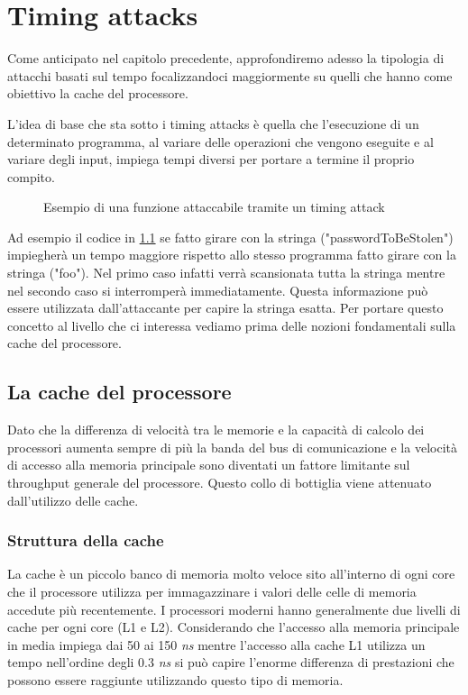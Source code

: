 \chapter{Timing attacks}
	Come anticipato nel capitolo precedente, approfondiremo adesso la tipologia di attacchi basati sul tempo focalizzandoci maggiormente su quelli che hanno come obiettivo la cache del processore. 
	
	L'idea di base che sta sotto i timing attacks è quella che l'esecuzione di un determinato programma, al variare delle operazioni che vengono eseguite e al variare degli input, impiega tempi diversi per portare a termine il proprio compito.
	
	\begin{figure}
		\begin{center}
			
			\caption{Esempio di una funzione attaccabile tramite un timing attack}
			\label{fig:timingBase}
		\end{center}
	\end{figure}
	
	Ad esempio il codice in \cref{fig:timingBase} se fatto girare con la stringa ("passwordToBeStolen") impiegherà un tempo maggiore rispetto allo stesso programma fatto girare con la stringa ("foo"). Nel primo caso infatti verrà scansionata tutta la stringa mentre nel secondo caso si interromperà immediatamente. Questa informazione può essere utilizzata dall'attaccante per capire la stringa esatta. Per portare questo concetto al livello che ci interessa vediamo prima delle nozioni fondamentali sulla cache del processore. 
	
	\section{La cache del processore}
		Dato che la differenza di velocità tra le memorie e la capacità di calcolo dei processori aumenta sempre di più \cite{hennessy2011computer} la banda del bus di comunicazione e la velocità di accesso alla memoria principale sono diventati un fattore limitante sul throughput generale del processore. Questo collo di bottiglia viene attenuato dall'utilizzo delle cache.
		
		\subsection{Struttura della cache}
			La cache è un piccolo banco di memoria molto veloce sito all'interno di ogni core che il processore utilizza per immagazzinare i valori delle celle di memoria accedute più recentemente. I processori moderni hanno generalmente due livelli di cache per ogni core (L1 e L2). Considerando che l'accesso alla memoria principale in media impiega dai 50 ai 150 \emph{ns} mentre l'accesso alla cache L1 utilizza un tempo nell'ordine degli 0.3 \emph{ns} si può capire l'enorme differenza di prestazioni che possono essere raggiunte utilizzando questo tipo di memoria.
			
